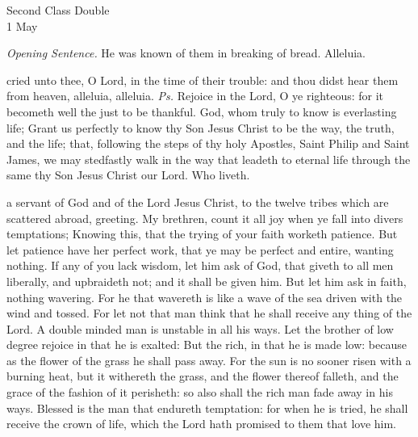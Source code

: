 \begin{inhead}
    {Second Class Double\\
1 May}
\end{inhead}
\par\noindent
\textit{Opening Sentence.} He was known of them in breaking of bread. Alleluia.\par

\introit
{} cried unto thee, O Lord, in the time of their trouble: and thou didst hear them from heaven, alleluia, alleluia. \textit{Ps.} Rejoice in the Lord, O ye righteous: for it becometh well the just to be thankful.
\collect
{} God, whom truly to know is everlasting life; Grant us perfectly to know thy Son Jesus Christ to be the way, the truth, and the life; that, following the steps of thy holy Apostles, Saint Philip and Saint James, we may stedfastly walk in the way that leadeth to eternal life through the same thy Son Jesus Christ our Lord. Who liveth.

 a servant of God and of the Lord Jesus Christ, to the twelve tribes which are scattered abroad, greeting. My brethren, count it all joy when ye fall into divers temptations; Knowing this, that the trying of your faith worketh patience. But let patience have her perfect work, that ye may be perfect and entire, wanting nothing. If any of you lack wisdom, let him ask of God, that giveth to all men liberally, and upbraideth not; and it shall be given him. But let him ask in faith, nothing wavering. For he that wavereth is like a wave of the sea driven with the wind and tossed. For let not that man think that he shall receive any thing of the Lord. A double minded man is unstable in all his ways. Let the brother of low degree rejoice in that he is exalted: But the rich, in that he is made low: because as the flower of the grass he shall pass away. For the sun is no sooner risen with a burning heat, but it withereth the grass, and the flower thereof falleth, and the grace of the fashion of it perisheth: so also shall the rich man fade away in his ways. Blessed is the man that endureth temptation: for when he is tried, he shall receive the crown of life, which the Lord hath promised to them that love him.

